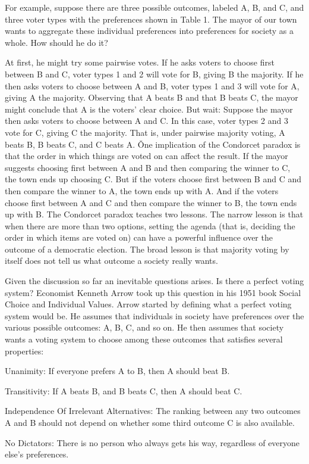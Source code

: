 \be
For example, suppose there are three possible outcomes, labeled A, B, and C, and three voter types with the
preferences shown in Table 1. The mayor of our town wants to aggregate these individual preferences into preferences
for society as a whole. How should he do it?


At first, he might try some pairwise votes. If he asks voters to choose first between B and C, voter types 1 and 2
will vote for B, giving B the majority. If he then asks voters to choose between A and B, voter types 1 and 3 will
vote for A, giving A the majority. Observing that A beats B and that B beats C, the mayor might conclude that A is
the voters' clear choice. But wait: Suppose the mayor then asks voters to choose between A and C. In this case, voter
types 2 and 3 vote for C, giving C the majority. That is, under pairwise majority voting, A beats B, B beats C, and C
beats A. \v

One implication of the Condorcet paradox is that the order in which things are voted on can affect the result. If the
mayor suggests choosing first between A and B and then comparing the winner to C, the town ends up choosing C. But if
the voters choose first between B and C and then compare the winner to A, the town ends up with A. And if the voters
choose first between A and C and then compare the winner to B, the town ends up with B. The Condorcet paradox teaches
two lessons. The narrow lesson is that when there are more than two options, setting the agenda (that is, deciding
the order in which items are voted on) can have a powerful influence over the outcome of a democratic election. The
broad lesson is that majority voting by itself does not tell us what outcome a society really wants.
\ee

Given the discussion so far an inevitable questions arises. Is there a perfect voting system? Economist Kenneth Arrow
took up this question in his 1951 book Social Choice and Individual Values. Arrow started by defining what a perfect
voting system would be. He assumes that individuals in society have preferences over the various possible outcomes:
A, B, C, and so on. He then assumes that society wants a voting system to choose among these outcomes that satisfies
several properties:
\bit
\item{Unanimity}: If everyone prefers A to B, then A should beat B\@.
\item{Transitivity}: If A beats B, and B beats C, then A should beat C\@.
\item{Independence Of Irrelevant Alternatives}: The ranking between any two outcomes A and B should not depend on
whether some third outcome C is also available.
\item{No Dictators}: There is no person who always gets his way, regardless of everyone else's preferences.
\eit


